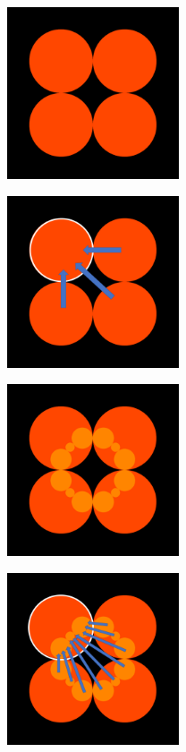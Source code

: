 \begin{figure}[htbp]
 \begin{minipage}{0.33\hsize}
  \center
  \includegraphics[width=2in, height=2in, keepaspectratio]{../img/klein/orbit/level0.pdf}
   \subcaption{}
  \label{fig:level0}
 \end{minipage}
 \begin{minipage}{0.33\hsize}
  \center
  \includegraphics[width=2in, height=2in, keepaspectratio]{../img/klein/orbit/level0inv.pdf}
  \subcaption{}
   \label{fig:level0inv}
 \end{minipage}
 \begin{minipage}{0.33\hsize}
  \center
  \includegraphics[width=2in, height=2in, keepaspectratio]{../img/klein/orbit/level1.pdf}
  \subcaption{}
   \label{fig:level1}
 \end{minipage}
 \begin{minipage}{0.33\hsize}
  \center
  \includegraphics[width=2in, height=2in, keepaspectratio]{../img/klein/orbit/level1inv.pdf}

\end{minipage}
\end{figure}
